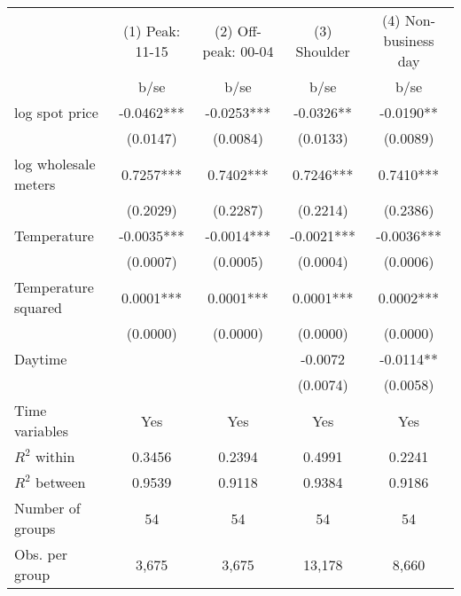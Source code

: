 \begin{tabular}{lcccc}\toprule
                    &(1) Peak: 11-15   &(2) Off-peak: 00-04   &(3) Shoulder   &(4) Non-business day   \\
                    &        b/se   &        b/se   &        b/se   &        b/se   \\
\midrule
log spot price      &     -0.0462***&     -0.0253***&     -0.0326** &     -0.0190** \\
                    &    (0.0147)   &    (0.0084)   &    (0.0133)   &    (0.0089)   \\
log wholesale meters&      0.7257***&      0.7402***&      0.7246***&      0.7410***\\
                    &    (0.2029)   &    (0.2287)   &    (0.2214)   &    (0.2386)   \\
Temperature         &     -0.0035***&     -0.0014***&     -0.0021***&     -0.0036***\\
                    &    (0.0007)   &    (0.0005)   &    (0.0004)   &    (0.0006)   \\
Temperature squared &      0.0001***&      0.0001***&      0.0001***&      0.0002***\\
                    &    (0.0000)   &    (0.0000)   &    (0.0000)   &    (0.0000)   \\
Daytime             &               &               &     -0.0072   &     -0.0114** \\
                    &               &               &    (0.0074)   &    (0.0058)   \\
Time variables      &         Yes   &         Yes   &         Yes   &         Yes   \\
\midrule
\(R^2\) within      &      0.3456   &      0.2394   &      0.4991   &      0.2241   \\
\(R^2\) between     &      0.9539   &      0.9118   &      0.9384   &      0.9186   \\
Number of groups    &          54   &          54   &          54   &          54   \\
Obs. per group      &       3,675   &       3,675   &      13,178   &       8,660   \\
\bottomrule\end{tabular}
